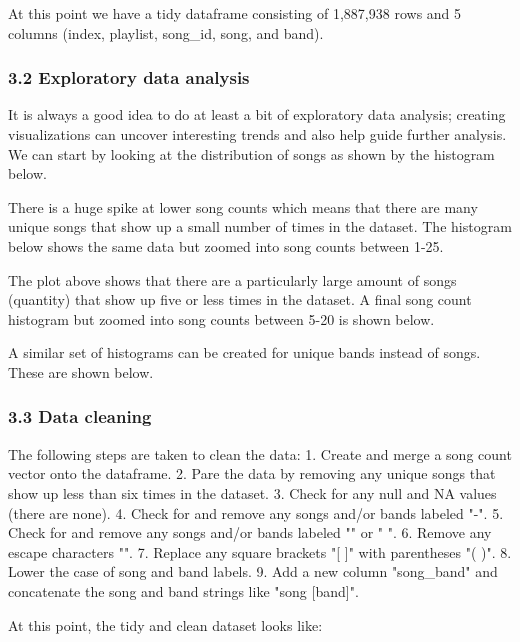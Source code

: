 \documentclass[11pt]{article}
\begin{document}
At this point we have a tidy dataframe consisting of 1,887,938 rows and
5 columns (index, playlist, song\_id, song, and band).

    \subsubsection{3.2 Exploratory data
analysis}\label{exploratory-data-analysis}

It is always a good idea to do at least a bit of exploratory data
analysis; creating visualizations can uncover interesting trends and
also help guide further analysis. We can start by looking at the
distribution of songs as shown by the histogram below.

    

    There is a huge spike at lower song counts which means that there are
many unique songs that show up a small number of times in the dataset.
The histogram below shows the same data but zoomed into song counts
between 1-25.

    

    The plot above shows that there are a particularly large amount of songs
(quantity) that show up five or less times in the dataset. A final song
count histogram but zoomed into song counts between 5-20 is shown below.

    

    A similar set of histograms can be created for unique bands instead of
songs. These are shown below.

    

    

    \subsubsection{3.3 Data cleaning}\label{data-cleaning}

    The following steps are taken to clean the data: 1. Create and merge a
song count vector onto the dataframe. 2. Pare the data by removing any
unique songs that show up less than six times in the dataset. 3. Check
for any null and NA values (there are none). 4. Check for and remove any
songs and/or bands labeled "-". 5. Check for and remove any songs and/or
bands labeled "" or " ". 6. Remove any escape characters "". 7. Replace
any square brackets "{[} {]}" with parentheses "( )". 8. Lower the case
of song and band labels. 9. Add a new column "song\_band" and
concatenate the song and band strings like "song {[}band{]}".

    At this point, the tidy and clean dataset looks like:
\end{document}
